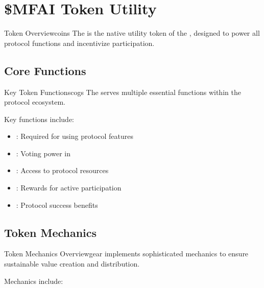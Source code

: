 
\section{\$MFAI Token Utility}

\begin{mfai-box}{Token Overview}{coins}
The  is the native utility token of the , designed to power all protocol functions and incentivize  participation.
\end{mfai-box}

\subsection{Core Functions}

\begin{mfai-box-learn}{Key Token Functions}{cogs}
The  serves multiple essential functions within the protocol ecosystem.
\end{mfai-box-learn}

Key functions include:

\begin{itemize}[leftmargin=*]
\item {}: Required for using protocol features
\item {}: Voting power in 
\item {}: Access to protocol resources
\item {}: Rewards for active participation
\item {}: Protocol success benefits
\end{itemize}

\subsection{Token Mechanics}

\begin{mfai-box-build}{Token Mechanics Overview}{gear}
 implements sophisticated mechanics to ensure sustainable value creation and distribution.
\end{mfai-box-build}

Mechanics include:

